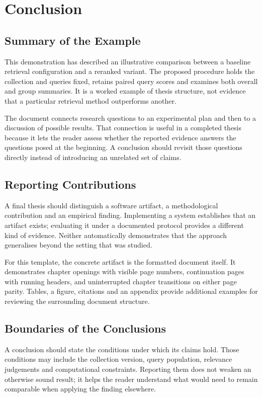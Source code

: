 \chapter{Conclusion}
\label{sec:conclusion}

\section{Summary of the Example}
This demonstration has described an illustrative comparison between a baseline
retrieval configuration and a reranked variant. The proposed procedure holds
the collection and queries fixed, retains paired query scores and examines
both overall and group summaries. It is a worked example of thesis structure,
not evidence that a particular retrieval method outperforms another.

The document connects research questions to an experimental plan and then to
a discussion of possible results. That connection is useful in a completed
thesis because it lets the reader assess whether the reported evidence answers
the questions posed at the beginning. A conclusion should revisit those
questions directly instead of introducing an unrelated set of claims.

\section{Reporting Contributions}
A final thesis should distinguish a software artifact, a methodological
contribution and an empirical finding. Implementing a system establishes that
an artifact exists; evaluating it under a documented protocol provides a
different kind of evidence. Neither automatically demonstrates that the
approach generalises beyond the setting that was studied.

For this template, the concrete artifact is the formatted document itself.
It demonstrates chapter openings with visible page numbers, continuation
pages with running headers, and uninterrupted chapter transitions on either
page parity. Tables, a figure, citations and an appendix provide additional
examples for reviewing the surrounding document structure.

\newpage
\section{Boundaries of the Conclusions}
A conclusion should state the conditions under which its claims hold. Those
conditions may include the collection version, query population, relevance
judgements and computational constraints. Reporting them does not weaken an
otherwise sound result; it helps the reader understand what would need to
remain comparable when applying the finding elsewhere.

